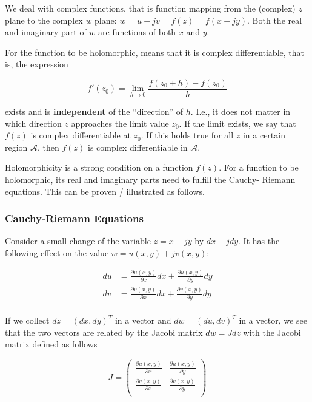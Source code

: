 
We deal with complex functions, that is function mapping from the
(complex) \(z\) plane to the complex \(w\) plane:
\(w=u+jv = f(z) = f(x+jy)\). Both the real and imaginary part of \(w\)
are functions of both \(x\) and \(y\).

For the function to be holomorphic, means that it is complex
differentiable, that is, the expression

\[
f'(z_0) = \lim_{h \rightarrow 0} \frac{f(z_0+h) - f(z_0)}{h}
\]

exists and is \textbf{independent} of the ``direction'' of \(h\). I.e.,
it does not matter in which direction \(z\) approaches the limit value
\(z_0\). If the limit exists, we say that \(f(z)\) is complex
differentiable at \(z_0\). If this holds true for all \(z\) in a certain
region \(\mathcal{A}\), then \(f(z)\) is complex differentiable in
\(\mathcal{A}\).

Holomorphicity is a strong condition on a function \(f(z)\). For a
function to be holomorphic, its real and imaginary parts need to fulfill
the Cauchy- Riemann equations. This can be proven / illustrated as
follows.

\subsubsection{Cauchy-Riemann Equations}

Consider a small change of the variable \(z=x+jy\) by \(dx+jdy\). It has
the following effect on the value \(w = u(x,y)+jv(x,y)\):


\begin{align*}
du &= \frac{\partial u(x,y)}{\partial x} dx + \frac{\partial u(x,y)}{\partial y} dy \\
dv &= \frac{\partial v(x,y)}{\partial x} dx + \frac{\partial v(x,y)}{\partial y} dy \\
\end{align*}


If we collect \(dz = (dx, dy)^T\) in a vector and \(dw = (du, dv)^T\) in
a vector, we see that the two vectors are related by the Jacobi matrix
\(dw = J dz\) with the Jacobi matrix defined as follows

\[J = \left(
\begin{array}{ccc}
\frac{\partial u(x,y)}{\partial x} & \frac{\partial u(x,y)}{\partial y} \\
\frac{\partial v(x,y)}{\partial x} & \frac{\partial v(x,y)}{\partial y} \\
\end{array}\right)
\]

